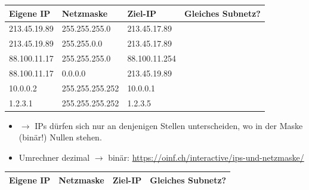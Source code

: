 \begin{myexercise}
	\begin{table}[H]
		\centering
		\begin{tabular}{lllm{2cm}}

			\textbf{Eigene \gls{IP}} & \textbf{Netzmaske} & \textbf{Ziel-\gls{IP}} & \textbf{Gleiches \newline Subnetz?} \\\midrule

			213.45.19.89             & 255.255.255.0      & 213.45.17.89           & \fldT                               \\\midrule

			213.45.19.89             & 255.255.0.0        & 213.45.17.89           & \fldT                               \\\midrule

			88.100.11.17             & 255.255.255.0      & 88.100.11.254          & \fldT                               \\\midrule

			88.100.11.17             & 0.0.0.0            & 213.45.19.89           & \fldT                               \\\midrule

			10.0.0.2                 & 255.255.255.252    & 10.0.0.1               & \fldT                               \\\midrule
			1.2.3.1                  & 255.255.255.252    & 1.2.3.5                & \fldT
		\end{tabular}
	\end{table}
	\begin{itemize}
		\item $\rightarrow$ \glspl{IP} dürfen sich nur an denjenigen Stellen unterscheiden, wo in der Maske (binär!) Nullen stehen.
		\item Umrechner dezimal $\rightarrow$ binär: \url{https://oinf.ch/interactive/ips-und-netzmaske/}
	\end{itemize}
	\begin{myanswer}

		\begin{table}[H]
			\centering
			\begin{tabular}{llll}

				\textbf{Eigene \acrshort{IP}} & \textbf{Netzmaske} & \textbf{Ziel-\acrshort{IP}}                       & \textbf{Gleiches Subnetz?}     \\\midrule


\end{tabular}
\end{table}
\end{myanswer}
\end{myexercise}
